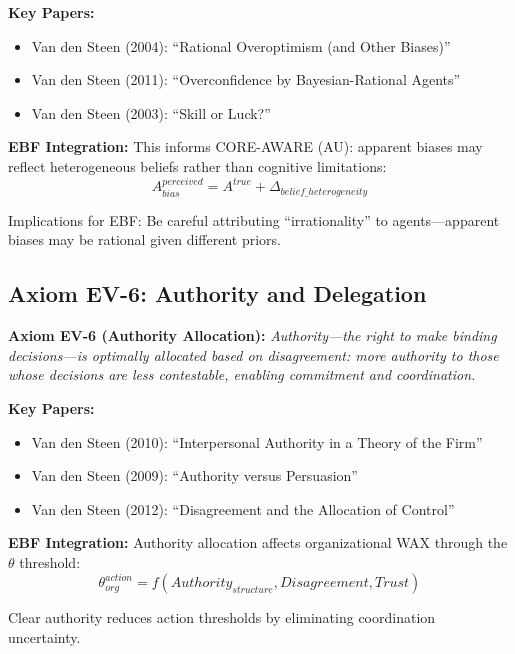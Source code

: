\textbf{Key Papers:}
\begin{itemize}[nosep]
    \item Van den Steen (2004): ``Rational Overoptimism (and Other Biases)''
    \item Van den Steen (2011): ``Overconfidence by Bayesian-Rational Agents''
    \item Van den Steen (2003): ``Skill or Luck?''
\end{itemize}

\textbf{EBF Integration:}
This informs CORE-AWARE (AU): apparent biases may reflect heterogeneous beliefs
rather than cognitive limitations:
\begin{equation}
A^{perceived}_{bias} = A^{true} + \Delta_{belief\_heterogeneity}
\end{equation}

Implications for EBF: Be careful attributing ``irrationality'' to agents---apparent
biases may be rational given different priors.

\subsection{Axiom EV-6: Authority and Delegation}

\begin{tcolorbox}[colback=blue!5!white, colframe=blue!75!black]
\textbf{Axiom EV-6 (Authority Allocation):}
\textit{Authority---the right to make binding decisions---is optimally allocated
based on disagreement: more authority to those whose decisions are less
contestable, enabling commitment and coordination.}
\end{tcolorbox}

\textbf{Key Papers:}
\begin{itemize}[nosep]
    \item Van den Steen (2010): ``Interpersonal Authority in a Theory of the Firm''
    \item Van den Steen (2009): ``Authority versus Persuasion''
    \item Van den Steen (2012): ``Disagreement and the Allocation of Control''
\end{itemize}

\textbf{EBF Integration:}
Authority allocation affects organizational WAX through the $\theta$ threshold:
\begin{equation}
\theta^{action}_{org} = f(Authority_{structure}, Disagreement, Trust)
\end{equation}

Clear authority reduces action thresholds by eliminating coordination uncertainty.

